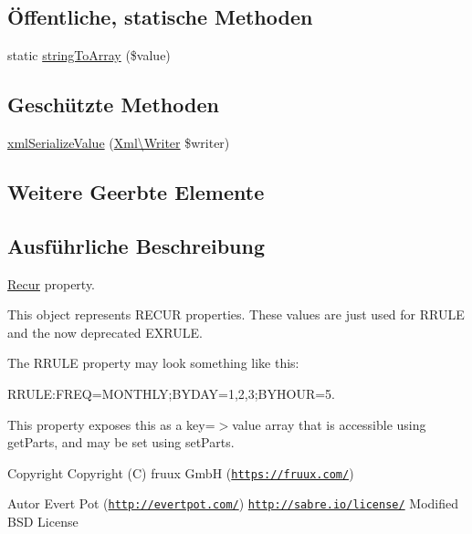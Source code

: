 \subsection*{Öffentliche, statische Methoden}
\begin{DoxyCompactItemize}
\item 
static \mbox{\hyperlink{class_sabre_1_1_v_object_1_1_property_1_1_i_calendar_1_1_recur_adb085f7cf05e7b8e0ec3232b2ea3b047}{string\+To\+Array}} (\$value)
\end{DoxyCompactItemize}
\subsection*{Geschützte Methoden}
\begin{DoxyCompactItemize}
\item 
\mbox{\hyperlink{class_sabre_1_1_v_object_1_1_property_1_1_i_calendar_1_1_recur_acac9ea5d848a9d2e6244765bf4c024c9}{xml\+Serialize\+Value}} (\mbox{\hyperlink{class_sabre_1_1_xml_1_1_writer}{Xml\textbackslash{}\+Writer}} \$writer)
\end{DoxyCompactItemize}
\subsection*{Weitere Geerbte Elemente}


\subsection{Ausführliche Beschreibung}
\mbox{\hyperlink{class_sabre_1_1_v_object_1_1_property_1_1_i_calendar_1_1_recur}{Recur}} property.

This object represents R\+E\+C\+UR properties. These values are just used for R\+R\+U\+LE and the now deprecated E\+X\+R\+U\+LE.

The R\+R\+U\+LE property may look something like this\+:

R\+R\+U\+LE\+:F\+R\+EQ=M\+O\+N\+T\+H\+LY;B\+Y\+D\+AY=1,2,3;B\+Y\+H\+O\+UR=5.

This property exposes this as a key=$>$value array that is accessible using get\+Parts, and may be set using set\+Parts.

\begin{DoxyCopyright}{Copyright}
Copyright (C) fruux GmbH (\href{https://fruux.com/}{\tt https\+://fruux.\+com/}) 
\end{DoxyCopyright}
\begin{DoxyAuthor}{Autor}
Evert Pot (\href{http://evertpot.com/}{\tt http\+://evertpot.\+com/})  \href{http://sabre.io/license/}{\tt http\+://sabre.\+io/license/} Modified B\+SD License 
\end{DoxyAuthor}


